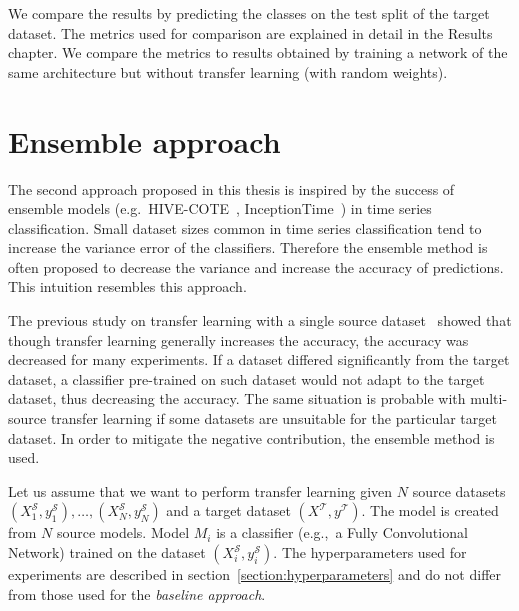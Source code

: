 \documentclass[a4paper,11pt,twoside]{report}
\theoremstyle{definition}
\begin{document}
We compare the results by predicting the classes on the test split of the target dataset. The metrics used for comparison are explained in detail in the Results chapter. We compare the metrics to results obtained by training a network of the same architecture but without transfer learning (with random weights).

\section{Ensemble approach}\label{section:ensemble}
The second approach proposed in this thesis is inspired by the success of ensemble models (e.g.~HIVE-COTE~\cite{hivecote}, InceptionTime~\cite{inceptiontime}) in time series classification. Small dataset sizes common in time series classification tend to increase the variance error of the classifiers. Therefore the ensemble method is often proposed to decrease the variance and increase the accuracy of predictions. This intuition resembles this approach.

The previous study on transfer learning with a single source dataset~\cite{transfer_learning_time_series} showed that though transfer learning generally increases the accuracy, the accuracy was decreased for many experiments. If a dataset differed significantly from the target dataset, a classifier pre-trained on such dataset would not adapt to the target dataset, thus decreasing the accuracy. The same situation is probable with multi-source transfer learning if some datasets are unsuitable for the particular target dataset. In order to mitigate the negative contribution, the ensemble method is used.

Let us assume that we want to perform transfer learning given $N$ source datasets $(X^\mathcal{S}_1, y^\mathcal{S}_1), \dots, (X^\mathcal{S}_N, y^\mathcal{S}_N)$ and a target dataset $(X^\mathcal{T}, y^\mathcal{T})$.
The model is created from $N$ source models. Model $M_i$ is a classifier (e.g.,~a Fully Convolutional Network) trained on the dataset $(X^\mathcal{S}_i, y^\mathcal{S}_i)$. The hyperparameters used for experiments are described in section~\ref{section:hyperparameters} and do not differ from those used for the \textit{baseline approach}. %
\end{document}
